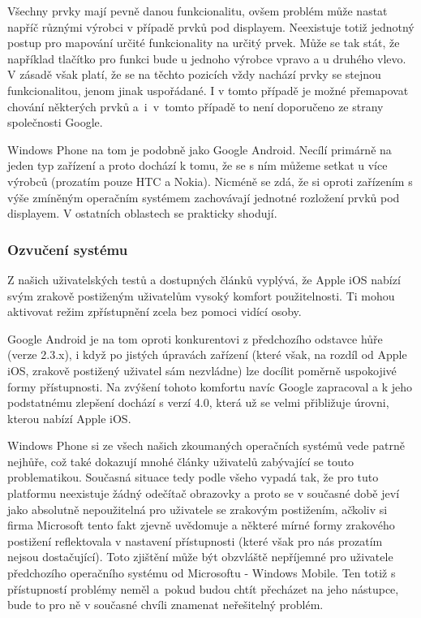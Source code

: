 \documentclass[thesis=M,czech]{FITthesis}[2012/06/26]
\begin{document}
Všechny prvky mají pevně danou funkcionalitu, ovšem problém může nastat napříč různými výrobci v případě prvků pod displayem. Neexistuje totiž jednotný postup pro mapování určité funkcionality na určitý prvek. Může se tak stát, že například tlačítko pro funkci  bude u jednoho výrobce vpravo a u druhého vlevo. V zásadě však platí, že se na těchto pozicích vždy nachází prvky se stejnou funkcionalitou, jenom jinak uspořádané. I v tomto případě je možné přemapovat chování některých prvků a~i~v~tomto případě to není doporučeno ze strany společnosti Google.

Windows Phone na tom je podobně jako Google Android. Necílí primárně na jeden typ zařízení a proto dochází k tomu, že se s ním můžeme setkat u více výrobců (prozatím pouze HTC a Nokia). Nicméně se zdá, že si oproti zařízením s výše zmíněným operačním systémem zachovávají jednotné rozložení prvků pod displayem. V ostatních oblastech se prakticky shodují.

\subsubsection*{Ozvučení systému}
Z našich uživatelských testů a dostupných článků\cite{ipad_blind}\cite{iphone_blind}\cite{iphone_inside} vyplývá, že Apple iOS nabízí svým zrakově postiženým uživatelům vysoký komfort použitelnosti. Ti mohou aktivovat režim zpřístupnění zcela bez pomoci vidící osoby.

Google Android je na tom oproti konkurentovi z předchozího odstavce hůře (verze 2.3.x), i když po jistých úpravách zařízení (které však, na rozdíl od Apple iOS, zrakově postižený uživatel sám nezvládne) lze docílit poměrně uspokojivé formy přístupnosti\cite{android_blind}. Na zvýšení tohoto komfortu navíc Google zapracoval a k jeho podstatnému zlepšení dochází s verzí 4.0, která už se velmi přibližuje úrovni, kterou nabízí Apple iOS\cite{android_start}.

Windows Phone si ze všech našich zkoumaných operačních systémů vede patrně nejhůře, což také dokazují mnohé články\cite{touch_yes_or_no}\cite{win8_blind}\cite{win8_blind2} uživatelů zabývající se touto problematikou. Současná situace tedy podle všeho vypadá tak, že pro tuto platformu neexistuje žádný odečítač obrazovky a proto se v současné době jeví jako absolutně nepoužitelná pro uživatele se zrakovým postižením, ačkoliv si firma Microsoft tento fakt zjevně uvědomuje a některé mírné formy zrakového postižení reflektovala v nastavení přístupnosti\cite{win8_no_reader} (které však pro nás prozatím nejsou dostačující). Toto zjištění může být obzvláště nepříjemné pro uživatele předchozího operačního systému od Microsoftu - Windows Mobile. Ten totiž s přístupností problémy neměl a~pokud budou chtít přecházet na jeho nástupce, bude to pro ně v současné chvíli znamenat neřešitelný problém.
\end{document}
